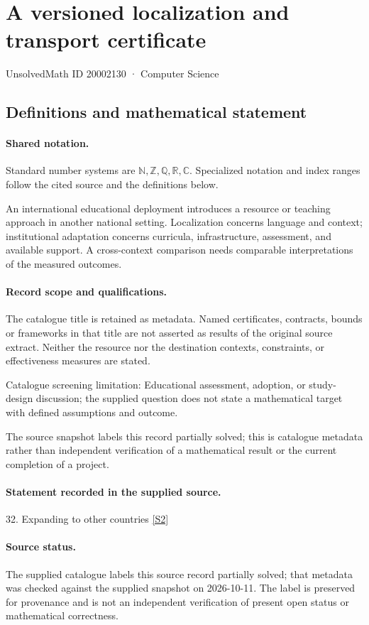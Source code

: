 \documentclass[11pt]{article}
\newcommand{\sref}[2]{\hyperlink{source:#1:#2}{[S#2]}}
\begin{document}
\setcounter{section}{20002129}
\section{A versioned localization and transport certificate}\label{20002130}
{\small\sffamily UnsolvedMath ID 20002130 · Computer Science}
\subsection{Definitions and mathematical statement}

\paragraph{Shared notation.}Standard number systems are $\mathbb N,\mathbb Z,\mathbb Q,\mathbb R,\mathbb C$. Specialized notation and index ranges follow the cited source and the definitions below.


An international educational deployment introduces a resource or teaching approach in another national setting. Localization concerns language and context; institutional adaptation concerns curricula, infrastructure, assessment, and available support. A cross-context comparison needs comparable interpretations of the measured outcomes.
\paragraph{Record scope and qualifications.}
The catalogue title is retained as metadata. Named certificates, contracts, bounds or frameworks in that title are not asserted as results of the original source extract.
Neither the resource nor the destination contexts, constraints, or effectiveness measures are stated.

Catalogue screening limitation: Educational assessment, adoption, or study-design discussion; the supplied question does not state a mathematical target with defined assumptions and outcome.

The source snapshot labels this record partially solved; this is catalogue metadata rather than independent verification of a mathematical result or the current completion of a project.
\paragraph{Statement recorded in the supplied source.}
32. Expanding to other countries \sref{20002130}{2}
\paragraph{Source status.}
The supplied catalogue labels this source record partially solved; that metadata was checked against the supplied snapshot on 2026-10-11. The label is preserved for provenance and is not an independent verification of present open status or mathematical correctness.
\end{document}
